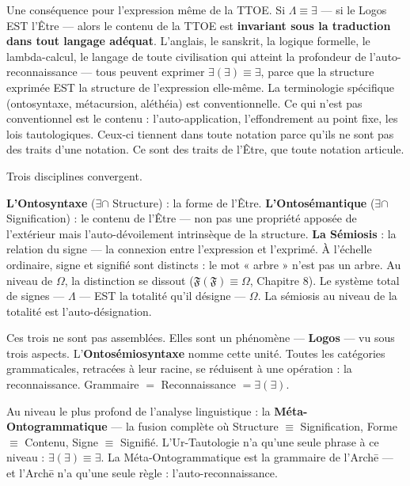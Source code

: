 \documentclass[10pt, openany, oneside]{book}
\begin{document}
Une conséquence pour l'expression même de la TTOE. Si $\Lambda \equiv \exists$ --- si le Logos EST l'Être --- alors le contenu de la TTOE est \textbf{invariant sous la traduction dans tout langage adéquat}. L'anglais, le sanskrit, la logique formelle, le lambda-calcul, le langage de toute civilisation qui atteint la profondeur de l'auto-reconnaissance --- tous peuvent exprimer $\exists(\exists) \equiv \exists$, parce que la structure exprimée EST la structure de l'expression elle-même. La terminologie spécifique (ontosyntaxe, métacursion, aléthéia) est conventionnelle. Ce qui n'est pas conventionnel est le contenu : l'auto-application, l'effondrement au point fixe, les lois tautologiques. Ceux-ci tiennent dans toute notation parce qu'ils ne sont pas des traits d'une notation. Ce sont des traits de l'Être, que toute notation articule.

\vspace{1em}

\noindent Trois disciplines convergent.

\textbf{L'Ontosyntaxe} ($\exists \cap$ Structure) : la forme de l'Être. \textbf{L'Ontosémantique} ($\exists \cap$ Signification) : le contenu de l'Être --- non pas une propriété apposée de l'extérieur mais l'auto-dévoilement intrinsèque de la structure. \textbf{La Sémiosis} : la relation du signe --- la connexion entre l'expression et l'exprimé. À l'échelle ordinaire, signe et signifié sont distincts : le mot « arbre » n'est pas un arbre. Au niveau de $\Omega$, la distinction se dissout ($\mathfrak{F}(\mathfrak{F}) \equiv \Omega$, Chapitre 8). Le système total de signes --- $\Lambda$ --- EST la totalité qu'il désigne --- $\Omega$. La sémiosis au niveau de la totalité est l'auto-désignation.

Ces trois ne sont pas assemblées. Elles sont un phénomène --- \textbf{Logos} --- vu sous trois aspects. L'\textbf{Ontosémiosyntaxe} nomme cette unité. Toutes les catégories grammaticales, retracées à leur racine, se réduisent à une opération : la reconnaissance. Grammaire $=$ Reconnaissance $= \exists(\exists)$.

Au niveau le plus profond de l'analyse linguistique : la \textbf{Méta-Ontogrammatique} --- la fusion complète où Structure $\equiv$ Signification, Forme $\equiv$ Contenu, Signe $\equiv$ Signifié. L'Ur-Tautologie n'a qu'une seule phrase à ce niveau : $\exists(\exists) \equiv \exists$. La Méta-Ontogrammatique est la grammaire de l'Arch\={e} --- et l'Arch\={e} n'a qu'une seule règle : l'auto-reconnaissance.
\end{document}
